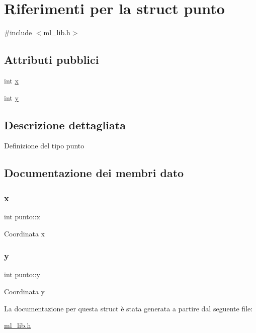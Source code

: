 \hypertarget{structpunto}{}\section{Riferimenti per la struct punto}
\label{structpunto}


{\ttfamily \#include $<$ml\+\_\+lib.\+h$>$}

\subsection*{Attributi pubblici}
\begin{DoxyCompactItemize}
\item 
int \hyperlink{structpunto_a258126d731de858fa7dc4a24f83c3f7d}{x}
\item 
int \hyperlink{structpunto_a31195a01422c6e9574235d9b0bf8d285}{y}
\end{DoxyCompactItemize}


\subsection{Descrizione dettagliata}
Definizione del tipo punto 

\subsection{Documentazione dei membri dato}
\mbox{\label{structpunto_a258126d731de858fa7dc4a24f83c3f7d}} 
\subsubsection{\texorpdfstring{x}{x}}
{\footnotesize\ttfamily int punto\+::x}

Coordinata x \mbox{\label{structpunto_a31195a01422c6e9574235d9b0bf8d285}} 
\subsubsection{\texorpdfstring{y}{y}}
{\footnotesize\ttfamily int punto\+::y}

Coordinata y 

La documentazione per questa struct è stata generata a partire dal seguente file\+:\begin{DoxyCompactItemize}
\item 
\hyperlink{ml__lib_8h}{ml\+\_\+lib.\+h}\end{DoxyCompactItemize}
